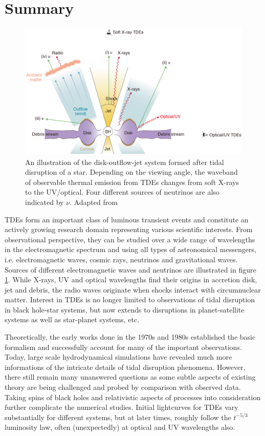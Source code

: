 \documentclass{tda}
\begin{document}
\section{Summary} \label{summary}

\begin{figure} [h]
	\centering
	\captionsetup{width=.85\linewidth}
	\includegraphics[width=.7\linewidth, height=.3\linewidth]{./images/hayasaki2021.png}
	\caption{An illustration of the disk-outflow-jet system formed after tidal disruption of a star. Depending on the viewing angle, the
waveband of observable thermal emission from TDEs changes from soft X-rays to the UV/optical. Four different sources of neutrinos are also indicated by \(\nu\). Adapted from \cite{hayasaki_neutrinos_2021}}
	\label{fig:em_neutrino_sources}
\end{figure}

TDEs form an important class of luminous transient events and constitute an actively growing research domain representing various scientific interests. From observational perspective, they can be studied over a wide range of wavelengths in the electromagnetic spectrum and using all types of astronomical messengers, i.e. electromagnetic waves, cosmic rays, neutrinos and gravitational waves. Sources of different electromagnetic waves and neutrinos are illustrated in figure \ref{fig:em_neutrino_sources}. While X-rays, UV and optical wavelengths find their origins in accretion disk, jet and debris, the radio waves originate when shocks interact with circumnuclear matter. Interest in TDEs is no longer limited to observations of tidal disruption in black hole-star systems, but now extends to disruptions in planet-satellite systems as well as star-planet systems, etc.

Theoretically, the early works done in the 1970s and 1980s established the basic formalism and successfully account for many of the important observations. Today, large scale hydrodynamical simulations have revealed much more informations of the intricate details of tidal disruption phenomena. However, there still remain many unanswered questions as some subtle aspects of existing theory are being challenged and probed by comparison with observed data. Taking spins of black holes and relativistic aspects of processes into consideration further complicate the numerical studies. Initial lightcurves for TDEs vary substantially for different systems, but at later times, roughly follow the \(t^{-5/3}\) luminosity law, often (unexpectedly) at optical and UV wavelengths also.
\end{document}

